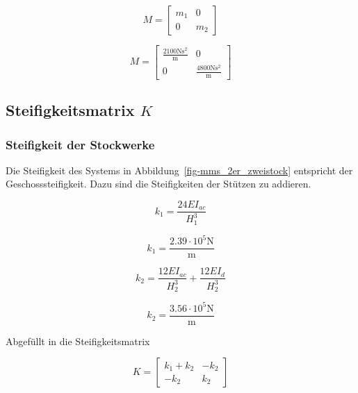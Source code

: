 \documentclass[
  letterpaper,
  DIV=11]{scrreprt}
\begin{document}
\begin{equation}M = \left[\begin{matrix}m_{1} & 0\\0 & m_{2}\end{matrix}\right]\end{equation}

\begin{equation}M = \left[\begin{matrix}\frac{2100 \text{N} \text{s}^{2}}{\text{m}} & 0\\0 & \frac{4800 \text{N} \text{s}^{2}}{\text{m}}\end{matrix}\right]\end{equation}

\hypertarget{steifigkeitsmatrix-k-1}{%
\subsection{\texorpdfstring{Steifigkeitsmatrix
\(K\)}{Steifigkeitsmatrix K}}\label{steifigkeitsmatrix-k-1}}

\hypertarget{steifigkeit-der-stockwerke-1}{%
\subsubsection{Steifigkeit der
Stockwerke}\label{steifigkeit-der-stockwerke-1}}

Die Steifigkeit des Systems in Abbildung~\ref{fig-mms_2er_zweistock}
entspricht der Geschosssteifigkeit. Dazu sind die Steifigkeiten der
Stützen zu addieren.

\begin{equation}k_{1} = \frac{24 EI_{ac}}{H_{1}^{3}}\end{equation}

\begin{equation}k_{1} = \frac{2.39 \cdot 10^{5} \text{N}}{\text{m}}\end{equation}

\begin{equation}k_{2} = \frac{12 EI_{ac}}{H_{2}^{3}} + \frac{12 EI_{d}}{H_{2}^{3}}\end{equation}

\begin{equation}k_{2} = \frac{3.56 \cdot 10^{5} \text{N}}{\text{m}}\end{equation}

Abgefüllt in die Steifigkeitsmatrix

\begin{equation}K = \left[\begin{matrix}k_{1} + k_{2} & - k_{2}\\- k_{2} & k_{2}\end{matrix}\right]\end{equation}
\end{document}

